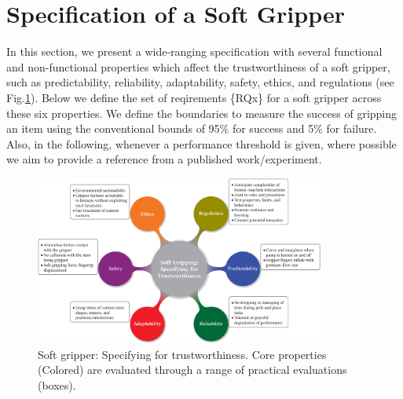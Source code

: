 \documentclass[lettersize,journal]{IEEEtran}
\begin{document}
\section{Specification of a Soft Gripper}\label{specification-gripper}
In this section, we present a wide-ranging specification with several functional and non-functional properties which affect the trustworthiness of a soft gripper, such as predictability, reliability, adaptability, safety, ethics, and regulations (see Fig.\ref{SR-spec}). Below we define the set of reqirements \{RQx\} for a soft gripper across these six properties.
We define the boundaries to measure the success of gripping an item using the conventional bounds of 95\% for success and 5\% for failure. 
Also, in the following, whenever a performance threshold is given, where possible we aim to provide a reference from a published work/experiment. 
\begin{figure}
	\centering
	\includegraphics[width=0.85\textwidth]{figures/soft-t-v2.png}
	\caption{Soft gripper: Specifying for trustworthiness. Core properties (Colored) are evaluated through a range of practical evaluations (boxes). }
	\label{SR-spec}
\end{figure}
\end{document}
